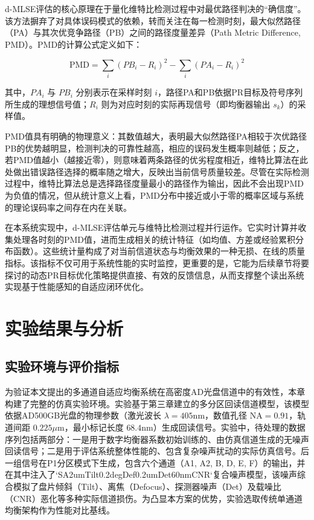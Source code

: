d-MLSE评估的核心原理在于量化维特比检测过程中对最优路径判决的“确信度”。该方法摒弃了对具体误码模式的依赖，转而关注在每一检测时刻，最大似然路径（PA）与其次优竞争路径（PB）之间的路径度量差异（Path Metric Difference, PMD）。PMD的计算公式定义如下：

\[
\text{PMD} = \sum_i (PB_i - R_i)^2 - \sum_i (PA_i - R_i)^2
\]

其中，$PA_i$ 与 $PB_i$ 分别表示在采样时刻 $i$，路径PA和PB依据PR目标及符号序列所生成的理想信号值；$R_i$ 则为对应时刻的实际再现信号（即均衡器输出 $s_k$）的采样值。

PMD值具有明确的物理意义：其数值越大，表明最大似然路径PA相较于次优路径PB的优势越明显，检测判决的可靠性越高，相应的误码发生概率则越低；反之，若PMD值越小（越接近零），则意味着两条路径的优劣程度相近，维特比算法在此处做出错误路径选择的概率随之增大，反映出当前信号质量较差。尽管在实际检测过程中，维特比算法总是选择路径度量最小的路径作为输出，因此不会出现PMD为负值的情况，但从统计意义上看，PMD分布中接近或小于零的概率区域与系统的理论误码率之间存在内在关联。

在本系统实现中，d-MLSE评估单元与维特比检测过程并行运作。它实时计算并收集处理各时刻的PMD值，进而生成相关的统计特征（如均值、方差或经验累积分布函数）。这些统计量构成了对当前信道状态与均衡效果的一种无损、在线的质量指标。该指标不仅可用于系统性能的实时监控，更重要的是，它能为后续章节将要探讨的动态PR目标优化策略提供直接、有效的反馈信息，从而支撑整个读出系统实现基于性能感知的自适应闭环优化。


\section{实验结果与分析}

\subsection{实验环境与评价指标}

为验证本文提出的多通道自适应均衡系统在高密度AD光盘信道中的有效性，本章构建了完整的仿真实验环境。实验基于第三章建立的多分区回读信道模型，该模型依据AD500GB光盘的物理参数（激光波长 $\lambda = 405 \text{nm}$，数值孔径 $\text{NA} = 0.91$，轨道间距 $0.225 \mu\text{m}$，最小标记长度 $68.4 \text{nm}$）生成回读信号。实验中，待处理的数据序列包括两部分：一是用于数字均衡器系数初始训练的、由仿真信道生成的无噪声回读信号；二是用于评估系统整体性能的、包含复杂噪声扰动的实际仿真信号。后一组信号在P1分区模式下生成，包含六个通道（A1, A2, B, D, E, F）的输出，并在其中注入了`SA2umTilt0.2degDef0.2umDet60nmCNR`复合噪声模型，该噪声综合模拟了盘片倾斜（Tilt）、离焦（Defocus）、探测器噪声（Det）及载噪比（CNR）恶化等多种实际信道损伤。为凸显本方案的优势，实验选取传统单通道均衡架构作为性能对比基线。

